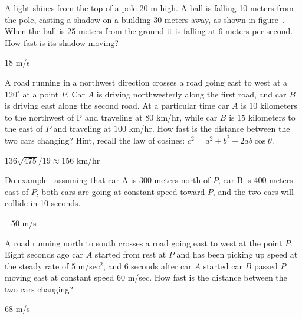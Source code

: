 \begin{exercises}
\begin{exercise}
A light shines from the top of a pole 20 m high. A ball is falling 10
meters from the pole, casting a shadow on a building 30 meters away,
as shown in figure~.
When the ball is 25 meters from the ground it is falling at 6 meters
per second. How fast is its shadow moving?
\begin{answer} 18 m/s
\end{answer}\end{exercise}


\begin{exercise} 
A road running in a northwest direction crosses a road going east to
west at a $120^\circ$ at a point $P$. Car $A$ is driving northwesterly
along the ﬁrst road, and car $B$ is driving east along the second
road. At a particular time car $A$ is $10$ kilometers to the northwest
of P and traveling at $80$ km/hr, while car $B$ is $15$ kilometers to
the east of $P$ and traveling at $100$ km/hr. How fast is the distance
between the two cars changing? Hint, recall the law of cosines:
$c^2=a^2+b^2-2ab\cos\theta$.
\begin{answer} $136\sqrt{475}/19\approx 156$ km/hr
\end{answer}\end{exercise}

\begin{exercise}
Do example~ assuming that
car A is 300 meters north of $P$, car B is 400 meters east of $P$, both
cars are going at constant speed toward $P$, and the two cars will collide in
10 seconds.
\begin{answer} $-50$ m/s
\end{answer}\end{exercise}

\begin{exercise}
A road running north to south crosses a road going east to west at the
point $P$. Eight seconds ago car $A$ started from rest at $P$ and has
been picking up speed at the steady rate of $5$ m/sec${}^2$, and $6$
seconds after car $A$ started car $B$ passed $P$ moving east at
constant speed 60 m/sec. How fast is the distance between the two cars
changing?
\begin{answer} $68$ m/s
\end{answer}\end{exercise}


\end{exercises}
